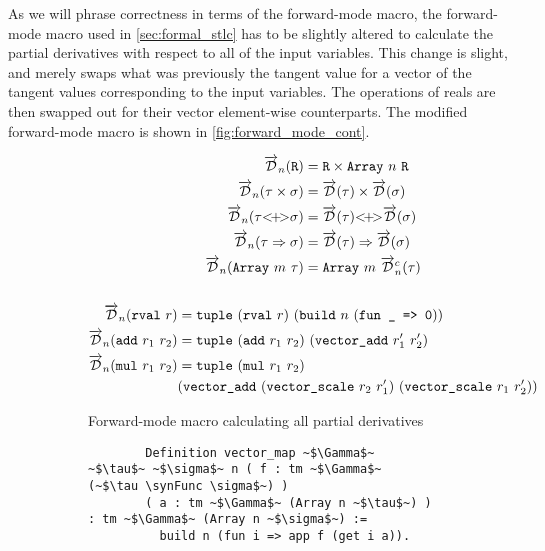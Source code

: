   As we will phrase correctness in terms of the forward-mode macro, the forward-mode macro used in \cref{sec:formal_stlc} has to be slightly altered to calculate the partial derivatives with respect to all of the input variables.
  This change is slight, and merely swaps what was previously the tangent value for a vector of the tangent values corresponding to the input variables.
  The operations of reals are then swapped out for their vector element-wise counterparts.
  The modified forward-mode macro is shown in \cref{fig:forward_mode_cont}.

  \begin{figure}
    \centering
    \begin{subfigure}{1\textwidth}
      \begin{gather*}
        \begin{aligned}
          \overrightarrow{\mathcal{D}}_n(\texttt{R}) &= \texttt{R} \times \texttt{Array}\ n\ \texttt{R} \\
          \overrightarrow{\mathcal{D}}_n(\tau \times \sigma) &= \overrightarrow{\mathcal{D}}(\tau) \times \overrightarrow{\mathcal{D}}(\sigma) \\
          \overrightarrow{\mathcal{D}}_n(\tau {<}\!{+}\!{>} \sigma) &= \overrightarrow{\mathcal{D}}(\tau) {<}\!{+}\!{>} \overrightarrow{\mathcal{D}}(\sigma) \\
          \overrightarrow{\mathcal{D}}_n(\tau \Rightarrow \sigma) &= \overrightarrow{\mathcal{D}}(\tau) \Rightarrow \overrightarrow{\mathcal{D}}(\sigma) \\
          \overrightarrow{\mathcal{D}}_n(\texttt{Array}\ m\ \tau) &= \texttt{Array}\ m\ \overrightarrow{\mathcal{D}}^c_n(\tau)
        \end{aligned} \\ \\
        \begin{aligned}
          \overrightarrow{\mathcal{D}}_n(\texttt{rval}\ r) &= \texttt{tuple}\ (\texttt{rval}\ r)\ (\texttt{build}\ n\ (\texttt{fun \_ => 0})) \\
          \overrightarrow{\mathcal{D}}_n(\texttt{add}\ r_1\ r_2) &= \texttt{tuple}\ (\texttt{add}\ r_1\ r_2)\ (\texttt{vector\_add}\ r_1'\ r_2') \\
          \overrightarrow{\mathcal{D}}_n(\texttt{mul}\ r_1\ r_2) &= \texttt{tuple}\ (\texttt{mul}\ r_1\ r_2)\ \\&(\texttt{vector\_add}\ (\texttt{vector\_scale}\ r_2\ r_1')\ (\texttt{vector\_scale}\ r_1\ r_2'))
        \end{aligned}
      \end{gather*}
      \caption{Forward-mode macro calculating all partial derivatives}
    \end{subfigure}
    \begin{subfigure}{1\textwidth}
      \begin{verbatim}
        Definition vector_map ~$\Gamma$~ ~$\tau$~ ~$\sigma$~ n ( f : tm ~$\Gamma$~ (~$\tau \synFunc \sigma$~) )
        ( a : tm ~$\Gamma$~ (Array n ~$\tau$~) ) : tm ~$\Gamma$~ (Array n ~$\sigma$~) :=
          build n (fun i => app f (get i a)).

\end{verbatim}
\end{subfigure}
\end{figure}
